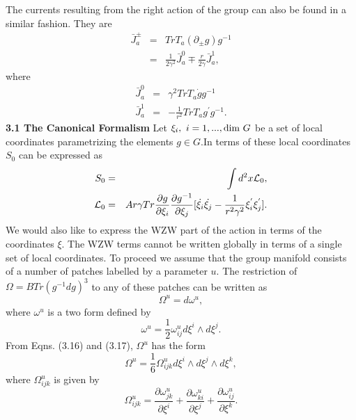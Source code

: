 \documentclass[a4paper,12pt]{article}
\begin{document}
The currents resulting from the right action of the group can also be
 found in a similar fashion. They are 
\begin{eqnarray}
\bar{J}^{\pm}_{a}&=&Tr T_a ({\partial}_{\pm}g)g^{-1}\nonumber\\
&=&\frac{1}{2{\gamma}^2}\bar{J}^{0}_a {\mp}\frac{r}{2{\gamma}}\bar{J}^{1}_a,
\end{eqnarray}
where
\begin{eqnarray}
\bar{J}^{0}_a&=&{\gamma}^2TrT_a\dot{g}g^{-1}\nonumber\\
\bar{J}^{1}_a&=&-\frac{1}{r^2}TrT_a g^{'}g^{-1}.
\end{eqnarray}
\vskip 5mm
\noindent
{\bf 3.1 The Canonical Formalism}
\vskip 5mm
\noindent
Let $ {\xi}_i, ~i=1,...,{\rm dim}~G$ 
be a set of local coordinates parametrizing the elements $g
\in G$\cite{bal}.In terms of these local coordinates $S_0$ can be 
 expressed as 
\begin{eqnarray}    
S_0&=&\int d^2x {\cal L}_0,\nonumber\\
{\cal L}_0&=&Ar{\gamma}Tr\frac{{\partial}g}{{\partial}{\xi}_i}
\frac{{\partial}g^{-1}}{{\partial}{\xi}_j}[ \dot{{\xi}_i}\dot{{\xi}_j} 
-\frac{1}{r^2{\gamma}^2}
{\xi}^{'}_i {\xi}^{'}_j ].
\end{eqnarray}
We would also like to express the WZW part of the action in terms of the
coordinates $\xi$. The WZW terms cannot be written globally in terms of a
single set of local coordinates. To proceed we 
assume that the group manifold
consists of a number of patches labelled by a parameter $u$. 
The restriction of 
${\Omega}=BTr(g^{-1}dg)^3$ to any of these patches can be written as 
\begin{equation}
{\Omega}^{u}=d{\omega}^{u},
\end{equation}
where ${\omega}^{u}$ is  a two form defined by 
\begin{equation}
{\omega}^{u}=\frac{1}{2}{\omega}^{u}_{ij} d{\xi}^{i}{\wedge}d{\xi}^{j}.
\end{equation}
From Eqns. (3.16) and (3.17),  $\Omega^u$ has the form
\begin{equation}
{\Omega}^{u}=\frac{1}{6}{\Omega}^{u}_{ijk}d{\xi}^{i}{\wedge}d{\xi}^{j}
{\wedge}d{\xi}^{k},
\end{equation}
where ${\Omega}^{u}_{ijk}$ is given by
\begin{equation}
{\Omega}^{u}_{ijk}=\frac{{\partial}{\omega}^{u}_{jk}}{{\partial}{\xi}^{i}} 
+ \frac{{\partial}{\omega}^{u}_{ki}}{{\partial}{\xi}^{j}} 
+ \frac{{\partial}{\omega}^{u}_{ij}}{{\partial}{\xi}^{k}}.
\end{equation}
\end{document}
